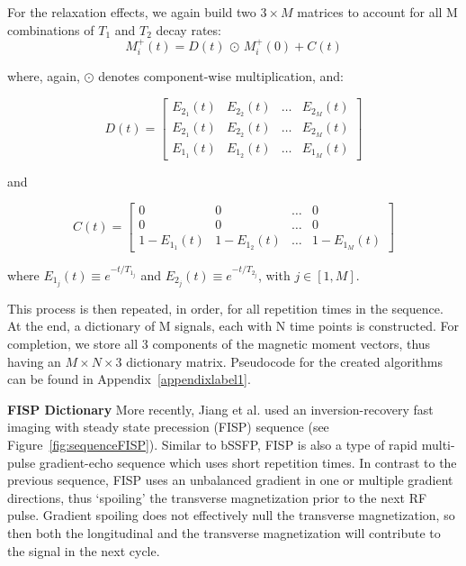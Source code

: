 For the relaxation effects, we again build two $3 \times M$ matrices to account for all M combinations of $T_1$ and $T_2$ decay rates:
\begin{equation}
    M^{+}_i(t) = D(t)  \, \odot \, M^{+}_i(0) + C(t) 
\end{equation}

where, again, $\odot$ denotes component-wise multiplication, and:

\begin{equation}
    D(t)  = 
    \begin{bmatrix}
        E_{2_1}(t)  & E_{2_2}(t)  & \dots & E_{2_M}(t)  \\
        E_{2_1}(t)  & E_{2_2}(t)  & \dots & E_{2_M}(t)  \\
        E_{1_1}(t)  & E_{1_2}(t)  & \dots & E_{1_M}(t)  
    \end{bmatrix}
\end{equation}

and

\begin{equation}
    C(t)  = 
    \begin{bmatrix}
        0 & 0 & \dots & 0 \\
        0 & 0 & \dots & 0 \\
        1 - E_{1_1}(t)  & 1- E_{1_2}(t)  & \dots & 1- E_{1_M}(t)  
    \end{bmatrix} 
\end{equation}

where $E_{1_j}(t) \equiv e^{-t/T_{1_j}}$ and $E_{2_j}(t) \equiv e^{-t/T_{2_j}}$, with $j \in [1, M]$.

\hfill 

This process is then repeated, in order, for all repetition times in the sequence.
At the end, a dictionary of M signals, each with N time points is constructed.
For completion, we store all 3 components of the magnetic moment vectors, thus having an $M \times N \times 3$ dictionary matrix.
Pseudocode for the created algorithms can be found in Appendix~\ref{appendixlabel1}.

\hfill

\large \textbf{FISP Dictionary} \normalsize
More recently, Jiang et al. \cite{Jiang2015} used an inversion-recovery fast imaging with steady state precession (FISP) sequence (see Figure~\ref{fig:sequenceFISP}). 
Similar to bSSFP, FISP is also a type of rapid multi-pulse gradient-echo sequence which uses short repetition times.
In contrast to the previous sequence, FISP uses an unbalanced gradient in one or multiple gradient directions, thus `spoiling' the transverse magnetization prior to the next RF pulse. 
Gradient spoiling does not effectively null the transverse magnetization, so then both the longitudinal and the transverse magnetization will contribute to the signal in the next cycle.

